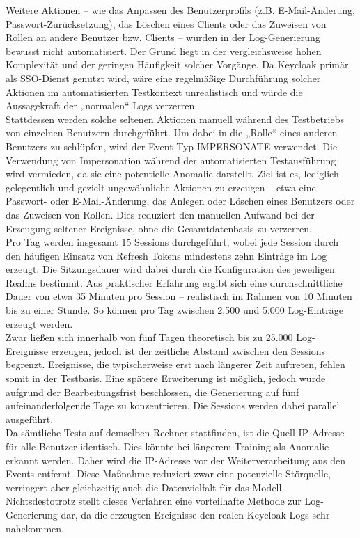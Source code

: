 \documentclass[a4paper,12pt]{article}
\begin{document}
	Weitere Aktionen – wie das Anpassen des Benutzerprofils (z.B. E-Mail-Änderung, Passwort-Zurücksetzung), das Löschen eines Clients oder das Zuweisen von Rollen an andere Benutzer bzw. Clients – wurden in der Log-Generierung bewusst nicht automatisiert. Der Grund liegt in der vergleichsweise hohen Komplexität und der geringen Häufigkeit solcher Vorgänge. Da Keycloak primär als SSO-Dienst genutzt wird, wäre eine regelmäßige Durchführung solcher Aktionen im automatisierten Testkontext unrealistisch und würde die Aussagekraft der „normalen“ Logs verzerren.
	\\[0.5em]
	Stattdessen werden solche seltenen Aktionen manuell während des Testbetriebs von einzelnen Benutzern durchgeführt. Um dabei in die „Rolle“ eines anderen Benutzers zu schlüpfen, wird der Event-Typ IMPERSONATE verwendet. Die Verwendung von Impersonation während der automatisierten Testausführung wird vermieden, da sie eine potentielle Anomalie darstellt. Ziel ist es, lediglich gelegentlich und gezielt ungewöhnliche Aktionen zu erzeugen – etwa eine Passwort- oder E-Mail-Änderung, das Anlegen oder Löschen eines Benutzers oder das Zuweisen von Rollen. Dies reduziert den manuellen Aufwand bei der Erzeugung seltener Ereignisse, ohne die Gesamtdatenbasis zu verzerren.
	\\[0.5em]
	Pro Tag werden insgesamt 15 Sessions durchgeführt, wobei jede Session durch den häufigen Einsatz von Refresh Tokens mindestens zehn Einträge im Log erzeugt. Die Sitzungsdauer wird dabei durch die Konfiguration des jeweiligen Realms bestimmt. Aus praktischer Erfahrung ergibt sich eine durchschnittliche Dauer von etwa 35 Minuten pro Session – realistisch im Rahmen von 10 Minuten bis zu einer Stunde. So können pro Tag zwischen 2.500 und 5.000 Log-Einträge erzeugt werden.
	\\[0.5em]
	Zwar ließen sich innerhalb von fünf Tagen theoretisch bis zu 25.000 Log-Ereignisse erzeugen, jedoch ist der zeitliche Abstand zwischen den Sessions begrenzt. Ereignisse, die typischerweise erst nach längerer Zeit auftreten, fehlen somit in der Testbasis. Eine spätere Erweiterung ist möglich, jedoch wurde aufgrund der Bearbeitungsfrist beschlossen, die Generierung auf fünf aufeinanderfolgende Tage zu konzentrieren. Die Sessions werden dabei parallel ausgeführt.
	\\[0.5em]
	Da sämtliche Tests auf demselben Rechner stattfinden, ist die Quell-IP-Adresse für alle Benutzer identisch. Dies könnte bei längerem Training als Anomalie erkannt werden. Daher wird die IP-Adresse vor der Weiterverarbeitung aus den Events entfernt. Diese Maßnahme reduziert zwar eine potenzielle Störquelle, verringert aber gleichzeitig auch die Datenvielfalt für das Modell.
	\\[0.5em]
	Nichtsdestotrotz stellt dieses Verfahren eine vorteilhafte Methode zur Log-Generierung dar, da die erzeugten Ereignisse den realen Keycloak-Logs sehr nahekommen.
	
\end{document}
